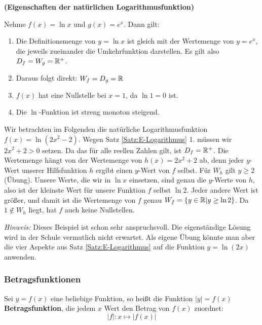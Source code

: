 \documentclass[ngerman, 12pt]{nssheetxea}
\begin{document}
\begin{theorem} \textbf{(Eigenschaften der natürlichen Logarithmusfunktion)} \par
Nehme $f(x)=\ln x$ und $g(x)=e^x$. Dann gilt:
\begin{enumerate}
\item Die Definitionsmenge von $y=\ln x$ ist gleich mit der Wertemenge von $y=e^x$, die jeweils zueinander die Umkehrfunktion darstellen. Es gilt also $D_f = W_g=\mathbb{R}^+$.
\item Daraus folgt direkt: $W_f=D_g=\mathbb{R}$
\item $f(x)$ hat eine Nullstelle bei $x=1$, da $\ln 1 = 0$ ist.
\item Die $\ln$-Funktion ist streng monoton steigend.
\end{enumerate}
\label{Satz:E-Logarithmus}
\end{theorem}

\begin{example}
Wir betrachten im Folgenden die natürliche Logarithmusfunktion $f(x)=\ln (2x^2-2)$. Wegen Satz \ref{Satz:E-Logarithmus} 1. müssen wir $2x^2+2>0$ setzen. Da das für alle reellen Zahlen gilt, ist $D_f=\mathbb{R}^+$. Die Wertemenge hängt von der Wertemenge von $h(x)=2x^2+2$ ab, denn jeder $y$-Wert unserer Hilfsfunktion $h$ ergibt einen $y$-Wert von $f$ selbst. Für $W_h$ gilt $y\geq 2$ (Übung). Unsere Werte, die wir in $\ln x$ einsetzen, sind genau die $y$-Werte von $h$, also ist der kleinste Wert für unsere Funktion $f$ selbst $\ln 2$. Jeder andere Wert ist größer, und damit ist die Wertemenge von $f$ genau $W_f=\{ y \in \mathbb{R} | y \geq \ln 2  \}$. Da $1 \notin W_h$ liegt, hat $f$ auch keine Nullstellen. \par
\textit{Hinweis:} Dieses Beispiel ist schon sehr anspruchsvoll. Die eigenständige Lösung wird in der Schule vermutlich nicht erwartet. Als eigene Übung könnte man aber die vier Aspekte aus Satz \ref{Satz:E-Logarithmus} auf die Funktion $y=\ln (2x)$ anwenden.
\end{example}

\subsubsection{Betragsfunktionen}

\begin{definition}
Sei $y=f(x)$ eine beliebige Funktion, so heißt die Funktion $|y|=f(x)$ \textbf{Betragsfunktion}, die jedem $x$ Wert den Betrag von $f(x)$ zuordnet:
\[ |f|: x \mapsto |f(x)|\]
 
\end{definition}
\end{document}

